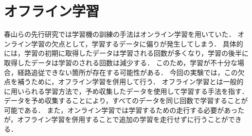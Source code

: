 \section{オフライン学習}
春山らの先行研究では学習機の訓練の手法はオンライン学習を用いていた．
オンライン学習の欠点として，学習するデータに偏りが発生してしまう．
具体的には，学習の初期に取得したデータは学習される回数が多くなり，学習の後半に取得したデータは学習のされる回数は減少する．
このため，学習が不十分な場合，経路追従できない箇所が存在する可能性がある．
今回の実験では，この欠点を補うために，オフライン学習を併用して行う．
オフライン学習とは一般的に用いられる学習方法で，予め収集したデータを使用して学習する手法を指す．
データを予め収集することにより，すべてのデータを同じ回数で学習することが可能である．
また，オンライン学習では学習するための走行する必要があったが，オフライン学習を併用することで追加の学習を走行せずに行うことができる．